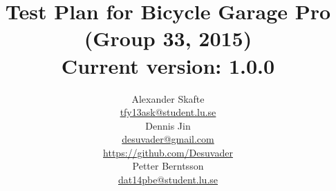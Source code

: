 \title{
	Test Plan for Bicycle Garage Pro\\
	(Group 33, 2015)\\
	\vspace{0.2in}
	\normalsize Current version: 1.0.0
}
\author{
	Alexander Skafte\\
	\url{tfy13ask@student.lu.se}\\
	Dennis Jin\\
	\url{desuvader@gmail.com}\\
	\url{https://github.com/Desuvader}\\
	Petter Berntsson\\
	\url{dat14pbe@student.lu.se}
}
\date{}
